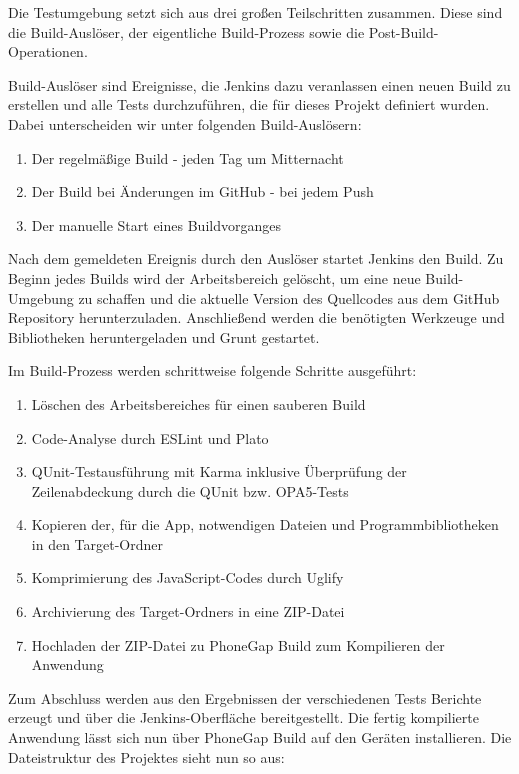 \newpage
{}
Die Testumgebung setzt sich aus drei großen Teilschritten zusammen. Diese sind die Build-Auslöser, der eigentliche Build-Prozess sowie die Post-Build-Operationen.

Build-Auslöser sind Ereignisse, die Jenkins dazu veranlassen einen neuen Build zu erstellen und alle Tests durchzuführen, die für dieses Projekt definiert wurden.
Dabei unterscheiden wir unter folgenden Build-Auslösern:
\begin{enumerate}
\item Der regelmäßige Build - jeden Tag um Mitternacht
\item Der Build bei Änderungen im GitHub - bei jedem Push
\item Der manuelle Start eines Buildvorganges
\end{enumerate}

Nach dem gemeldeten Ereignis durch den Auslöser startet Jenkins den Build. Zu Beginn jedes Builds wird der Arbeitsbereich gelöscht, um eine neue Build-Umgebung zu schaffen und die aktuelle Version des Quellcodes aus dem GitHub Repository herunterzuladen. Anschließend werden die benötigten Werkzeuge und Bibliotheken heruntergeladen und Grunt gestartet.

\SuperPar Im Build-Prozess werden schrittweise folgende Schritte ausgeführt:

\begin{enumerate}
\item Löschen des Arbeitsbereiches für einen sauberen Build
\item Code-Analyse durch ESLint und Plato
\item QUnit-Testausführung mit Karma inklusive Überprüfung der Zeilenabdeckung durch die QUnit bzw. OPA5-Tests
\item Kopieren der, für die App, notwendigen Dateien und Programmbibliotheken in den Target-Ordner
\item Komprimierung des JavaScript-Codes durch Uglify
\item Archivierung des Target-Ordners in eine ZIP-Datei
\item Hochladen der ZIP-Datei zu PhoneGap Build zum Kompilieren der Anwendung
\end{enumerate}

Zum Abschluss werden aus den Ergebnissen der verschiedenen Tests Berichte erzeugt und über die Jenkins-Oberfläche bereitgestellt. Die fertig kompilierte Anwendung lässt sich nun über PhoneGap Build auf den Geräten installieren. Die Dateistruktur des Projektes sieht nun so aus:


